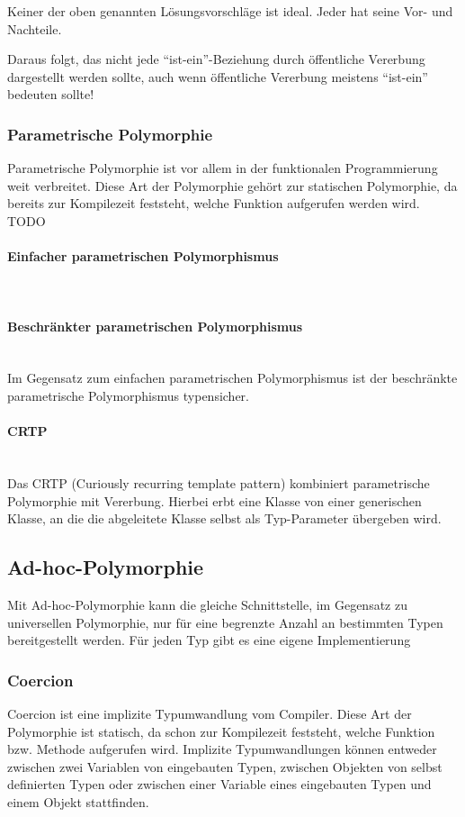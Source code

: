 					Keiner der oben genannten Lösungsvorschläge ist ideal. Jeder hat seine Vor- und Nachteile.
					
					Daraus folgt, das nicht jede ``ist-ein''-Beziehung durch öffentliche Vererbung dargestellt
					werden sollte, auch wenn öffentliche Vererbung meistens ``ist-ein'' bedeuten sollte!
			
		\subsubsection{Parametrische Polymorphie}
			Parametrische Polymorphie ist vor allem in der funktionalen Programmierung weit verbreitet. Diese Art der
			Polymorphie gehört zur statischen Polymorphie, da bereits zur Kompilezeit feststeht, welche Funktion aufgerufen
			werden wird.
			TODO
			\paragraph{Einfacher parametrischen Polymorphismus}\mbox{}\\
			
			\paragraph{Beschränkter parametrischen Polymorphismus}\mbox{}\\
				Im Gegensatz zum einfachen parametrischen Polymorphismus ist der beschränkte parametrische Polymorphismus
				typensicher.
				
			\paragraph{CRTP}\mbox{}\\
				Das CRTP (Curiously recurring template pattern) kombiniert parametrische Polymorphie mit Vererbung. Hierbei
				erbt eine Klasse von einer generischen Klasse, an die die abgeleitete Klasse selbst als Typ-Parameter übergeben
				wird.
				
		
	\subsection{Ad-hoc-Polymorphie}
		Mit Ad-hoc-Polymorphie kann die gleiche Schnittstelle, im Gegensatz zu universellen Polymorphie, nur für eine
		begrenzte Anzahl an bestimmten Typen bereitgestellt werden. Für jeden Typ gibt es eine eigene Implementierung
	
		\subsubsection{Coercion}
			Coercion ist eine implizite Typumwandlung vom Compiler. Diese Art der Polymorphie ist statisch, da schon zur
			Kompilezeit feststeht, welche Funktion bzw. Methode aufgerufen wird. Implizite Typumwandlungen können entweder
			zwischen zwei Variablen von eingebauten Typen, zwischen Objekten von selbst definierten Typen oder zwischen
			einer Variable eines eingebauten Typen und einem Objekt stattfinden. 
			
